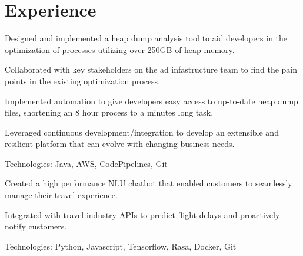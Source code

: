 \documentclass[]{deedy-resume-openfont}
\begin{document}
%
%
\lastupdated

%
%

%
%

\begin{minipage}[t]{0.64\textwidth} 


\section{Experience}
\vspace{\topsep} %
\begin{tightemize}
    \item Designed and implemented a heap dump analysis tool to aid developers in the
    optimization of processes utilizing over 250GB of heap memory.
    \item Collaborated with key stakeholders on the ad infastructure team
    to find the pain points in the existing optimization process.
    \item Implemented automation to give developers easy access to up-to-date 
    heap dump files, shortening an 8 hour process to a minutes long task.
    \item Leveraged continuous development/integration to develop an extensible
    and resilient platform that can evolve with changing business needs.
    \item Technologies: Java, AWS, CodePipelines, Git
    \end{tightemize}
\sectionsep

\begin{tightemize}
    \item Created a high performance NLU chatbot that enabled customers to seamlessly 
    manage their travel experience.
    \item Integrated with travel industry APIs to predict flight delays and proactively
    notify customers.
    \item Technologies: Python, Javascript, Tensorflow, Rasa, Docker, Git
    \end{tightemize}
\sectionsep


\end{minipage}
\end{document}
